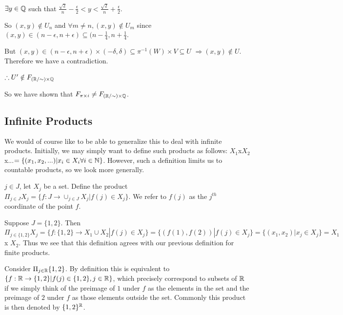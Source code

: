 $\exists y \in \mathbb Q$ such that $\frac{\sqrt{2}}{n} - \frac{\epsilon}{2} < y < \frac{\sqrt{2}}{n} + \frac{\epsilon}{2}$.

So $(x,y) \notin U_n$ and $\forall m\neq n, (x,y)\notin U_m$ since $(x,y) \in (n-\epsilon, n+\epsilon)\subseteq (n-\frac{1}{4}, n+\frac{1}{4}$.

But $(x,y) \in (n-\epsilon, n+\epsilon) \times (-\delta, \delta) \subseteq \pi^{-1}(W) \times V \subseteq U$ $\Rightarrow (x,y) \notin U$. Therefore we have a contradiction.

$\therefore U' \notin F_{(\mathbb R/\sim)\times \mathbb Q}$

So we have shown that $F_{\pi\times i} \neq F_{(\mathbb R/\sim) \times \mathbb Q}$.

\subsection{Infinite Products} We would of course like to be able to generalize this to deal with infinite products. Initially, we may simply want to define such products as follows: $X_1$x$X_2$x...$=\{(x_1,x_2,...)|x_i \in X_i \forall i \in \mathbb N \}$. However, such a definition limits us to countable products, so we look more generally. 
\begin{definition}
	$j \in J$, let $X_j$ be a set. Define the product $\Pi_{j \in J} X_j = \{f:J \rightarrow \cup_{j \in J}X_j|f(j) \in X_j\}.$ We refer to $f(j)$ as the $j^{th}$ coordinate of the point $f$. 
\end{definition}
\begin{example}
	Suppose $J = \{1,2\}$. Then $\Pi_{j\in \{1,2\}}X_j = \{f: \{1,2\} \rightarrow X_1\cup X_2|f(j) \in X_j\} = \{(f(1),f(2))|f(j) \in X_j\}=\{(x_1,x_2)|x_j \in X_j\} = X_1$ x $X_2.$ Thus we see that this definition agrees with our previous definition for finite products. 
\end{example}
\begin{example}
	Consider $\Pi_{j \in \mathbb R}\{1,2\}$. By definition this is equivalent to $\{f: \mathbb R \rightarrow \{1,2\}| f(j) \in \{1,2\}, j \in \mathbb R\}$, which precisely correspond to subsets of $\mathbb R$ if we simply think of the preimage of $1$ under $f$ as the elements in the set and the preimage of $2$ under $f$ as those elements outside the set. Commonly this product is then denoted by $\{1,2\}^{\mathbb R}$. 
\end{example}

